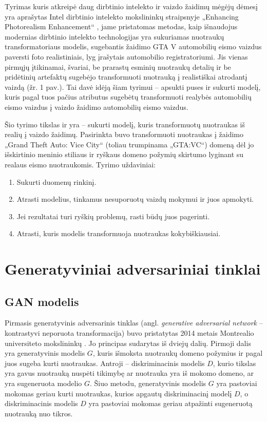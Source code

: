 \documentclass{VUMIFPSkursinis}
\begin{document}
    Tyrimas kuris atkreipė daug dirbtinio intelekto ir vaizdo žaidimų mėgėjų dėmesį yra aprašytas Intel dirbtinio intelekto mokslininkų straipsnyje „Enhancing Photorealism Enhancement“ \cite{EnPhEn}, jame pristatomas metodas, kaip išnaudojus modernias dirbtinio intelekto technologijas yra sukuriamas nuotraukų transformatoriaus modelis, sugebantis žaidimo GTA V automobilių eismo vaizdus paversti foto realistiniais, lyg įrašytais automobilio registratoriumi. Jis vienas pirmųjų įtikinamai, švariai, be prarastų esminių nuotraukų detalių ir be pridėtinių artefaktų sugebėjo transformuoti nuotrauką į realistiškai atrodantį vaizdą (žr. 1 pav.). Tai davė idėją šiam tyrimui – apsukti puses ir sukurti modelį, kuris pagal tuos pačius atributus sugebėtų transformuoti realybės automobilių eismo vaizdus į vaizdo žaidimo automobilių eismo vaizdus.
    
    Šio tyrimo tikslas ir yra – sukurti modelį, kuris transformuotų nuotraukas iš realių į vaizdo žaidimų. Pasirinkta buvo transformuoti nuotraukas į  žaidimo „Grand Theft Auto: Vice City“ (toliau trumpinama „GTA:VC“) domeną dėl jo išskirtinio meninio stiliaus ir ryškaus domeno požymių skirtumo lyginant su realaus eismo nuotraukomis. Tyrimo uždaviniai:
    \begin{enumerate}
        \item Sukurti duomenų rinkinį.
        \item Atrasti modelius, tinkamus nesuporuotų vaizdų mokymui ir juos apmokyti.
        \item Jei rezultatai turi ryškių problemų, rasti būdų juos pagerinti.
        \item Atrasti, kuris modelis transformuoja nuotraukas kokybiškiausiai.
    \end{enumerate}
    
    
\section{Generatyviniai adversariniai tinklai}
    \subsection{GAN modelis}
        Pirmasis generatyvinis adversarinis tinklas (angl. \emph{generative adversarial network} – kontrastyvi neporuota transformacija) buvo pristatytas 2014 metais Montrealio universiteto mokslininkų \cite{OrigGan}. Jo principas sudarytas iš dviejų dalių. Pirmoji dalis yra generatyvinis modelis $G$, kuris išmoksta nuotraukų domeno požymius ir pagal juos sugeba kurti nuotraukas. Antroji – diskriminacinis modelis $D$, kurio tikslas yra gavus nuotrauką nuspėti tikimybę ar nuotrauka yra iš mokomo domeno, ar yra sugeneruota modelio $G$. Šiuo metodu, generatyvinis modelis $G$ yra pastoviai mokomas geriau kurti nuotraukas, kurios apgautų diskriminacinį modelį $D$, o diskriminacinis modelis $D$ yra pastoviai mokomas geriau atpažinti sugeneruotą nuotrauką nuo tikros.
\end{document}
